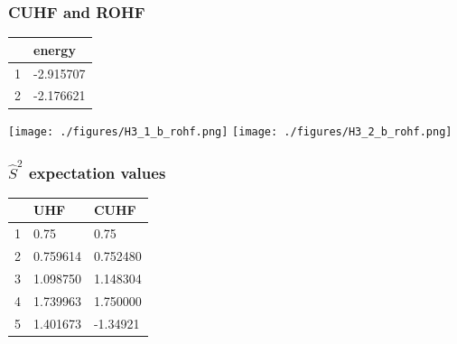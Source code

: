 \documentclass[aspectratio=169]{beamer}
\begin{document}
\begin{frame}
    \frametitle{CUHF and ROHF}

\begin{minipage}[b]{0.35\linewidth}
    \begin{table}
        \label{tab:ROHF}
        \begin{tabular}{l|l}
            & energy    \\
          \hline
          1 & -2.915707 \\
          2 & -2.176621
        \end{tabular}
      \end{table}
\end{minipage}
\begin{minipage}[b]{0.6\linewidth}
    \begin{center}
    \texttt{[image: ./figures/H3\_1\_b\_rohf.png]}
    \texttt{[image: ./figures/H3\_2\_b\_rohf.png]}
    \end{center}
\end{minipage}
\end{frame}
\begin{frame}
    \frametitle{$\hat{S}^2$ expectation values}
    \begin{table}[h]
        \label{tab:spincon}
        \begin{tabular}{l|l|l}
            & UHF      & CUHF     \\
          \hline
          1 & 0.75     & 0.75     \\
          2 & 0.759614 & 0.752480 \\
          3 & 1.098750 & 1.148304 \\
          4 & 1.739963 & 1.750000 \\
          5 & 1.401673 & -1.34921
        \end{tabular}
      \end{table}
\end{frame}
\end{document}
